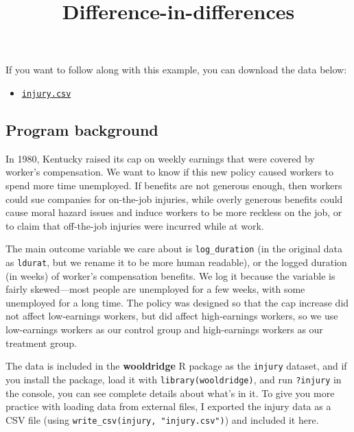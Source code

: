 \documentclass[
  letterpaper,
  DIV=11,
  numbers=noendperiod]{scrartcl}
\title{Difference-in-differences}
\author{}
\date{}
\providecommand{\tightlist}{%
  \setlength{\itemsep}{0pt}\setlength{\parskip}{0pt}}\usepackage{longtable,booktabs,array}
\begin{document}
\maketitle
\ifdefined\Shaded\renewenvironment{Shaded}{\begin{tcolorbox}[enhanced, frame hidden, interior hidden, boxrule=0pt, borderline west={3pt}{0pt}{shadecolor}, sharp corners, breakable]}{\end{tcolorbox}}\fi

If you want to follow along with this example, you can download the data
below:

\begin{itemize}
\tightlist
\item
  \href{/files/data/package_data/injury.csv}{ \texttt{injury.csv}}
\end{itemize}

\hypertarget{program-background}{%
\subsection{Program background}\label{program-background}}

In 1980, Kentucky raised its cap on weekly earnings that were covered by
worker's compensation. We want to know if this new policy caused workers
to spend more time unemployed. If benefits are not generous enough, then
workers could sue companies for on-the-job injuries, while overly
generous benefits could cause moral hazard issues and induce workers to
be more reckless on the job, or to claim that off-the-job injuries were
incurred while at work.

The main outcome variable we care about is \texttt{log\_duration} (in
the original data as \texttt{ldurat}, but we rename it to be more human
readable), or the logged duration (in weeks) of worker's compensation
benefits. We log it because the variable is fairly skewed---most people
are unemployed for a few weeks, with some unemployed for a long time.
The policy was designed so that the cap increase did not affect
low-earnings workers, but did affect high-earnings workers, so we use
low-earnings workers as our control group and high-earnings workers as
our treatment group.

The data is included in the \textbf{wooldridge} R package as the
\texttt{injury} dataset, and if you install the package, load it with
\texttt{library(wooldridge)}, and run \texttt{?injury} in the console,
you can see complete details about what's in it. To give you more
practice with loading data from external files, I exported the injury
data as a CSV file (using \texttt{write\_csv(injury,\ "injury.csv")})
and included it here.
\end{document}
